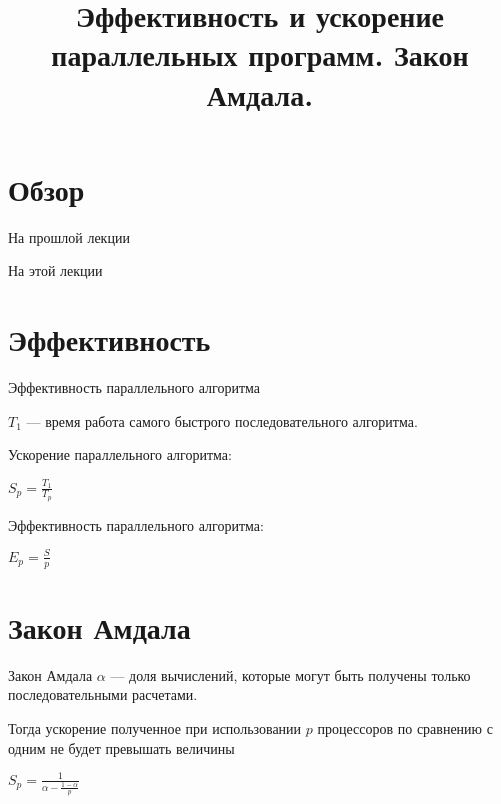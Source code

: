 

\title{Эффективность и ускорение параллельных программ. Закон Амдала.}



\begin{frame}
\titlepage
\end{frame}

\section*{Обзор}

\begin{frame}{На прошлой лекции}
\end{frame}

\begin{frame}{На этой лекции}
\tableofcontents
\end{frame}

\section{Эффективность}

\begin{frame}{Эффективность параллельного алгоритма}

$T_1$ --- время работа самого быстрого последовательного алгоритма.

Ускорение параллельного алгоритма:

$S_p = \frac{T_1}{T_p}$

Эффективность параллельного алгоритма:

$E_p = \frac{S}{p}$

\end{frame}

\section{Закон Амдала}

\begin{frame}{Закон Амдала}
$\alpha$ --- доля вычислений, которые могут быть получены только
последовательными расчетами.

\bigskip

Тогда ускорение полученное при использовании $p$ процессоров по сравнению с
одним не будет превышать величины

\bigskip

$S_p =\frac{1}{\alpha - \frac{1 - \alpha}{p}}$
\end{frame}

